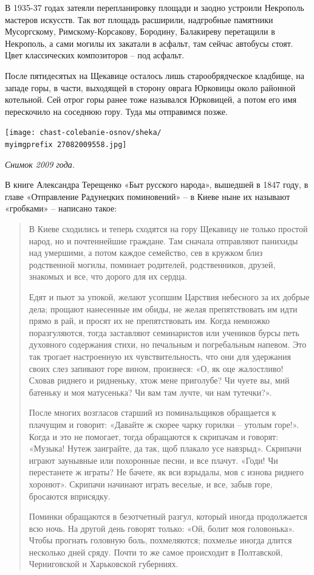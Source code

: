 В 1935-37 годах затеяли перепланировку площади и заодно устроили Некрополь мастеров искусств. Так вот площадь расширили, надгробные памятники Мусоргскому, Римскому-Корсакову, Бородину, Балакиреву перетащили в Некрополь, а сами могилы их закатали в асфальт, там сейчас автобусы стоят. Цвет классических композиторов – под асфальт.

После пятидесятых на Щекавице осталось лишь старообрядческое кладбище, на западе горы, в части, выходящей в сторону оврага Юрковицы около районной котельной. Сей отрог горы ранее тоже назывался Юрковицей, а потом его имя перескочило на соседнюю гору. Туда мы отправимся позже.

\begin{center}
\texttt{[image: chast-colebanie-osnov/sheka/\\myimgprefix 27082009558.jpg]}

\textit{Снимок 2009 года.}
\end{center}



В книге Александра Терещенко «Быт русского народа», вышедшей в 1847 году, в главе «Отправление Радунецких поминовений» – в Киеве ныне их называют «гробками» – написано такое:

\begin{quotation}
В Киеве сходились и теперь сходятся на гору Щекавицу не только простой народ, но и почтеннейшие граждане. Там сначала отправляют панихиды над умершими, а потом каждое семейство, сев в кружком близ родственной могилы, поминает родителей, родственников, друзей, знакомых и все, что дорого для их сердца. 

Едят и пьют за упокой, желают усопшим Царствия небесного за их добрые дела; прощают нанесенные им обиды, не желая препятствовать им идти прямо в рай, и просят их не препятствовать им. Когда немножко поразгуляются, тогда заставляют семинаристов или учеников бурсы петь духовного содержания стихи, но печальным и погребальным напевом. Это так трогает настроенную их чувствительность, что они для удержания своих слез запивают горе вином, произнеся: «О, як оце жалостливо! Сховав риднего и ридненьку, хтож мене приголубе? Чи чуете вы, мий батеньку и моя матусенька? Чи вам там лучте, чи нам тутечки?».

После многих возгласов старший из поминальщиков обращается к плачущим и говорит: «Давайте ж скорее чарку горилки – утолым горе!». Когда и это не помогает, тогда обращаются к скрипачам и говорят: «Музыка! Нутеж заиграйте, да так, щоб плакало усе навзрыд». Скрипачи играют заунывные или похоронные песни, и все плачут. «Годи! Чи перестанете ж играты? Не бачете, як вси взрыдалы, мов с изнова риднего хоронют». Скрипачи начинают играть веселые, и все, забыв горе, бросаются вприсядку. 

Поминки обращаются в безотчетный разгул, который иногда продолжается всю ночь. На другой день говорят только: «Ой, болит моя головонька». Чтобы прогнать головную боль, похмеляются; похмелье иногда длится несколько дней сряду. Почти то же самое происходит в Полтавской, Черниговской и Харьковской губерниях.
\end{quotation}

